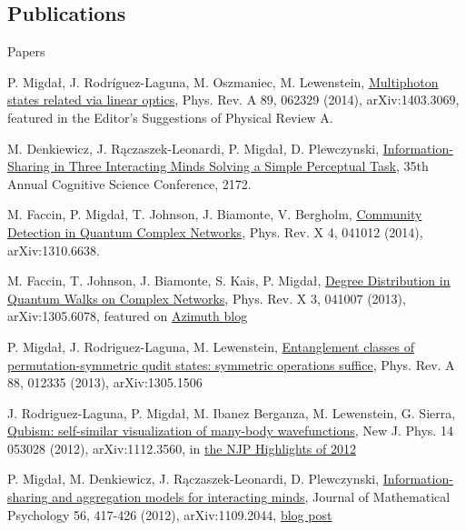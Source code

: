 \documentclass[margin,line]{resume}
\begin{document}
\begin{resume}
    \section{\mysidestyle Publications}
    Papers
    \begin{list2}
        \item P. Migdał, J. Rodríguez-Laguna, M. Oszmaniec, M. Lewenstein,
        \href{http://arxiv.org/abs/1403.3069}{Multiphoton states related via linear optics}, Phys. Rev. A 89, 062329 (2014), arXiv:1403.3069,
        featured in the Editor's Suggestions of Physical Review A.
        \item M. Denkiewicz, J. Rączaszek-Leonardi, P. Migdał, D. Plewczynski,
        \href{https://mindmodeling.org/cogsci2013/papers/0398/}{Information-Sharing in Three Interacting Minds Solving a Simple Perceptual Task},
        35th Annual Cognitive Science Conference, 2172.
        \item M. Faccin, P. Migdał, T. Johnson, J. Biamonte, V. Bergholm,
        \href{http://arxiv.org/abs/1310.6638}{Community Detection in Quantum Complex Networks}, Phys. Rev. X 4, 041012 (2014), arXiv:1310.6638.
        \item M. Faccin, T. Johnson, J. Biamonte, S. Kais, P. Migdał,
        \href{http://arxiv.org/abs/1305.6078}{Degree Distribution in Quantum Walks on Complex Networks},
        Phys. Rev. X 3, 041007 (2013),
        arXiv:1305.6078,
        featured on \href{http://johncarlosbaez.wordpress.com/2013/08/05/quantum-network-theory-part-1/}{Azimuth blog}
        \item P. Migdał, J. Rodriguez-Laguna, M. Lewenstein,
        \href{http://arxiv.org/abs/1305.1506}{Entanglement classes of permutation-symmetric qudit states: symmetric operations suffice},
        Phys. Rev. A 88, 012335 (2013), arXiv:1305.1506
        \item J. Rodriguez-Laguna, P. Migdał, M. Ibanez Berganza, M. Lewenstein, G. Sierra, \href{http://dx.doi.org/10.1088/1367-2630/14/5/053028}{Qubism: self-similar visualization of many-body wavefunctions}, New J. Phys. 14 053028 (2012), arXiv:1112.3560,
        in \href{http://iopscience.iop.org/1367-2630/page/Highlights%20of%202012}{the NJP Highlights of 2012}
		\item P. Migdał, M. Denkiewicz, J. Rączaszek-Leonardi, D. Plewczynski, \href{http://arxiv.org/abs/1109.2044}{Information-sharing and aggregation models for interacting minds},
        Journal of Mathematical Psychology 56, 417-426 (2012),
        arXiv:1109.2044,
        \href{http://egtheory.wordpress.com/2014/01/30/two-heads-are-better-than-one-how-about-more/}{blog post}

\end{list2}
\end{resume}
\end{document}
